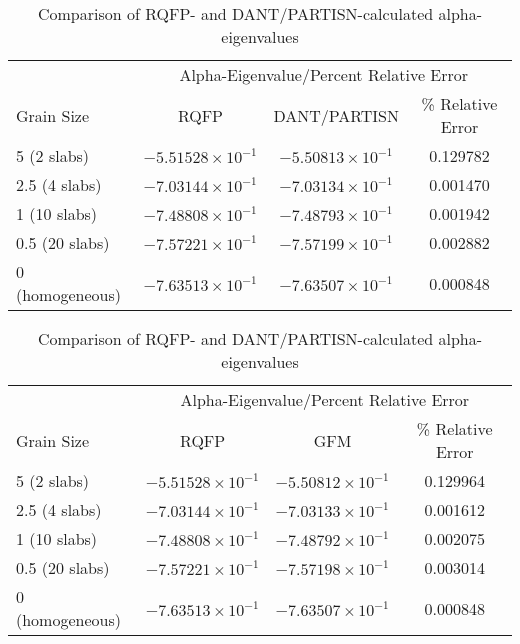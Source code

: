 \begin{table}[!htbp]
	\caption{Comparison of RQFP-calculated eigenvalues to various methods for multi-region scattering slab ($M = 500$, $L = 64$, Tolerance = $10^{-12}$)}
	\label{table:RQ_DE_DANT_GFM}
	\begin{subtable}[h]{1.0\textwidth}
	\centering{}
	\begin{tabular}{@{}lccc@{}}\toprule
	& \multicolumn{3}{c}{Alpha-Eigenvalue/Percent Relative Error} \\
	\cmidrule{2-4} Grain Size & RQFP & DANT/PARTISN & \% Relative Error \\
	\midrule
	5 (2 slabs) & $-5.51528 \times 10^{-1}$ & $-5.50813 \times 10^{-1}$ & 0.129782 \\ 
	2.5 (4 slabs) & $-7.03144 \times 10^{-1}$ & $-7.03134 \times 10^{-1}$ & 0.001470 \\ 
	1 (10 slabs) & $-7.48808 \times 10^{-1}$ & $-7.48793 \times 10^{-1}$ & 0.001942 \\ 
	0.5 (20 slabs) & $-7.57221 \times 10^{-1}$ & $-7.57199 \times 10^{-1}$ & 0.002882 \\ 
	0 (homogeneous) & $-7.63513 \times 10^{-1}$ & $-7.63507 \times 10^{-1}$ & 0.000848 \\ 
	\bottomrule
	\end{tabular}
	\caption{Comparison of RQFP- and DANT/PARTISN-calculated alpha-eigenvalues}
	\label{AlphaDANT}
	\end{subtable}%
	\vspace{0.25cm}
	\begin{subtable}[h]{1.0\textwidth}
	\centering{}
	\begin{tabular}{@{}lccc@{}}\toprule
	& \multicolumn{3}{c}{Alpha-Eigenvalue/Percent Relative Error} \\
	\cmidrule{2-4} Grain Size & RQFP & GFM & \% Relative Error \\
	\midrule
	5 (2 slabs) & $-5.51528 \times 10^{-1}$ & $-5.50812 \times 10^{-1}$ & 0.129964 \\ 
	2.5 (4 slabs) & $-7.03144 \times 10^{-1}$ & $-7.03133 \times 10^{-1}$ & 0.001612 \\ 
	1 (10 slabs) & $-7.48808 \times 10^{-1}$ & $-7.48792 \times 10^{-1}$ & 0.002075 \\ 
	0.5 (20 slabs) & $-7.57221 \times 10^{-1}$ & $-7.57198 \times 10^{-1}$ & 0.003014 \\ 
	0 (homogeneous) & $-7.63513 \times 10^{-1}$ & $-7.63507 \times 10^{-1}$ & 0.000848 \\ 

\end{tabular}
\end{subtable}
\end{table}
